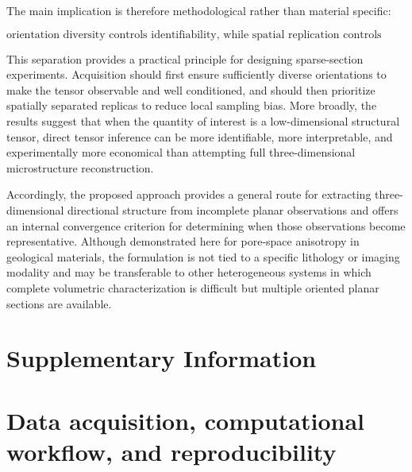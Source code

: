 \documentclass{article}
\begin{document}
The main implication is therefore methodological rather than material specific:

\begin{equation}
    \boxed{
    \text{orientation diversity controls identifiability, while spatial replication controls representativity.}
    }
\end{equation}

This separation provides a practical principle for designing sparse-section experiments. Acquisition should first ensure sufficiently diverse orientations to make the tensor observable and well conditioned, and should then prioritize spatially separated replicas to reduce local sampling bias. More broadly, the results suggest that when the quantity of interest is a low-dimensional structural tensor, direct tensor inference can be more identifiable, more interpretable, and experimentally more economical than attempting full three-dimensional microstructure reconstruction.

Accordingly, the proposed approach provides a general route for extracting three-dimensional directional structure from incomplete planar observations and offers an internal convergence criterion for determining when those observations become representative. Although demonstrated here for pore-space anisotropy in geological materials, the formulation is not tied to a specific lithology or imaging modality and may be transferable to other heterogeneous systems in which complete volumetric characterization is difficult but multiple oriented planar sections are available.


\section*{Supplementary Information}
\label{sec:supplementary}

\setcounter{section}{0}
\renewcommand{\thesection}{S\arabic{section}}
\renewcommand{\thefigure}{S\arabic{figure}}
\renewcommand{\thetable}{S\arabic{table}}
\renewcommand{\theequation}{S\arabic{equation}}

\section{Data acquisition, computational workflow, and reproducibility}
\label{sec:SI_reproducibility}
\end{document}
